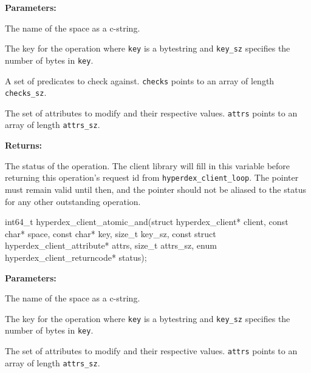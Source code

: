 \noindent\textbf{Parameters:}
\begin{description}[labelindent=\widthof{{\texttt{checks}, \texttt{checks\_sz}}},leftmargin=*,noitemsep,nolistsep,align=right]
\item[\texttt{space}] The name of the space as a c-string.
\item[\texttt{key}, \texttt{key\_sz}] The key for the operation where \texttt{key} is a bytestring and \texttt{key\_sz} specifies the number of bytes in \texttt{key}.
\item[\texttt{checks}, \texttt{checks\_sz}] A set of predicates to check against.  \texttt{checks} points to an array of length \texttt{checks\_sz}.
\item[\texttt{attrs}, \texttt{attrs\_sz}] The set of attributes to modify and their respective values.  \texttt{attrs} points to an array of length \texttt{attrs\_sz}.
\end{description}

\noindent\textbf{Returns:}
\begin{description}[labelindent=\widthof{{\texttt{status}}},leftmargin=*,noitemsep,nolistsep,align=right]
\item[\texttt{status}] The status of the operation.  The client library will fill in this variable before returning this operation's request id from \texttt{hyperdex\_client\_loop}.  The pointer must remain valid until then, and the pointer should not be aliased to the status for any other outstanding operation.
\end{description}

\funcsep
{}
\begin{ccode}
int64_t hyperdex_client_atomic_and(struct hyperdex_client* client,
                const char* space,
                const char* key, size_t key_sz,
                const struct hyperdex_client_attribute* attrs, size_t attrs_sz,
                enum hyperdex_client_returncode* status);
\end{ccode}
\funcdesc 

\noindent\textbf{Parameters:}
\begin{description}[labelindent=\widthof{{\texttt{attrs}, \texttt{attrs\_sz}}},leftmargin=*,noitemsep,nolistsep,align=right]
\item[\texttt{space}] The name of the space as a c-string.
\item[\texttt{key}, \texttt{key\_sz}] The key for the operation where \texttt{key} is a bytestring and \texttt{key\_sz} specifies the number of bytes in \texttt{key}.
\item[\texttt{attrs}, \texttt{attrs\_sz}] The set of attributes to modify and their respective values.  \texttt{attrs} points to an array of length \texttt{attrs\_sz}.
\end{description}

